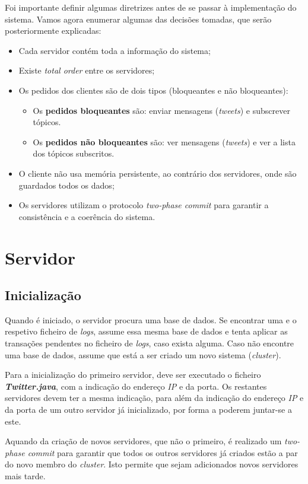 \documentclass[a4paper]{report}
\begin{document}
	Foi importante definir algumas diretrizes antes de se passar à implementação do sistema. Vamos agora enumerar algumas das decisões tomadas, que serão posteriormente explicadas:
	\begin{itemize}
			\item Cada servidor contém toda a informação do sistema;
			\item Existe \textit{total order} entre os servidores;
			\item Os pedidos dos clientes são de dois tipos (bloqueantes e não bloqueantes):
			\begin{itemize}
				\item Os \textbf{pedidos bloqueantes} são: enviar mensagens (\textit{tweets}) e subscrever tópicos. 
				\item Os \textbf{pedidos não bloqueantes} são: ver mensagens (\textit{tweets}) e ver a lista dos tópicos subscritos.
			\end{itemize}
			\item O cliente não usa memória persistente, ao contrário dos servidores, onde são guardados todos os dados;
			\item Os servidores utilizam o protocolo \textit{two-phase commit} para garantir a consistência e a coerência do sistema.
		\end{itemize}

	\section{Servidor}

		\subsection{Inicialização}
		Quando é iniciado, o servidor procura uma base de dados. Se encontrar uma e o respetivo ficheiro de \textit{logs}, assume essa mesma base de dados e tenta aplicar as transações pendentes no ficheiro de \textit{logs}, caso exista alguma.
		Caso não encontre uma base de dados, assume que está a ser criado um novo sistema (\textit{cluster}).

		Para a inicialização do primeiro servidor, deve ser executado o ficheiro \textit{\textbf{Twitter.java}}, com a indicação do endereço \textit{IP} e da porta.
		Os restantes servidores devem ter a mesma indicação, para além da indicação do endereço \textit{IP} e da porta de um outro servidor já inicializado, por forma a poderem juntar-se a este.

		Aquando da criação de novos servidores, que não o primeiro, é realizado um \textit{two-phase commit} para garantir que todos os outros servidores já criados estão a par do novo membro do \textit{cluster}.
		Isto permite que sejam adicionados novos servidores mais tarde.
\end{document}

